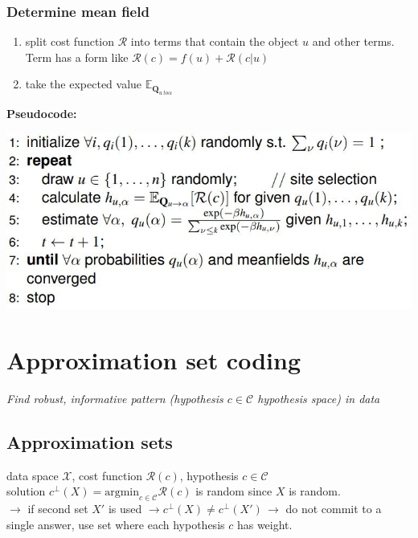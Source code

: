 \documentclass[9pt,parskip]{scrartcl}
\begin{document}
\begin{multicols*}{4}
\subsubsection*{Determine mean field}
\begin{enumerate}
	\item split cost function $\mathcal{R}$ into terms that contain the object $u$ and other terms. Term has a form like $\mathcal{R}(c) = f(u) + \mathcal{R}(c|u)$
	\item take the expected value $\mathbb{E}_{\mathbf{Q}_{u \ to \alpha}}$
\end{enumerate}
\textbf{Pseudocode:}
\begin{center}
\includegraphics[width=0.8\linewidth]{pictures/meanfields_pseudocode.jpg}
\end{center}
\section*{Approximation set coding}
\textit{Find robust, informative pattern (hypothesis $c\in \mathcal{C}$ hypothesis space) in data }
\subsection*{Approximation sets}
data space $\mathcal{X}$, cost function $\mathcal{R}(c)$, hypothesis $c\in \mathcal{C}$ \\
solution $c^{\bot}(X) = \text{argmin}_{c \in \mathcal{C}} \mathcal{R}(c)$ is random since $X$ is random. \\
$\to$ if second set $X'$ is used $\to c^{\bot}(X) \neq c^{\bot}(X') \, \to$ do not commit to a single answer, use set where each hypothesis $c$ has weight. \\

\end{multicols*}
\end{document}
